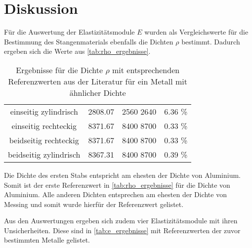 \section{Diskussion}
\label{sec:Diskussion}


Für die Auswertung der Elastizitätsmodule $E$ wurden als Vergleichswerte für die Bestimmung des Stangenmaterials ebenfalls die Dichten $\rho$ bestimmt. Dadurch ergeben sich die Werte aus \autoref{tab:rho_ergebnisse}.

\begin{table}
  \centering
  \caption{Ergebnisse für die Dichte $\rho$ mit entsprechenden Referenzwerten aus der Literatur für ein Metall mit ähnlicher Dichte\cite{dichten_metalle}}
  \label{tab:rho_ergebnisse}
  \begin{tabular}{c S c S}
    \toprule 
    &  &  &  \\ 
    \midrule 
    einseitig zylindrisch & 2808.07 & {2560  2640} & 6.36 \% \\
    einseitig rechteckig & 8371.67 & {8400  8700} & 0.33 \% \\
    beidseitig rechteckig & 8371.67 & {8400  8700} & 0.33 \% \\
    beidseitig zylindrisch & 8367.31 & {8400  8700} & 0.39 \% \\
    \bottomrule
  \end{tabular}
\end{table}

Die Dichte des ersten Stabs entspricht am ehesten der Dichte von Aluminium. Somit ist der erste Referenzwert in \autoref{tab:rho_ergebnisse} für die Dichte von Aluminium.
Alle anderen Dichten entsprechen am ehesten der Dichte von Messing und somit wurde hierfür der Referenzwert gelistet.

Aus den Auswertungen ergeben sich zudem vier Elastizitätsmodule mit ihren Unsicherheiten. Diese sind in \autoref{tab:e_ergebnisse} mit Referenzwerten der zuvor bestimmten Metalle gelistet.

